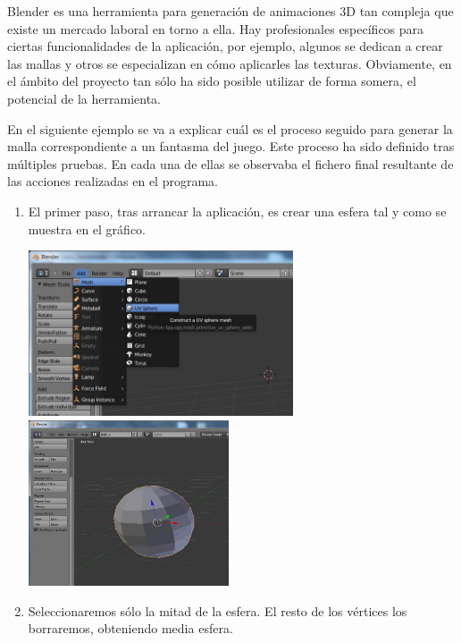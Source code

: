 Blender es una herramienta para generación de animaciones 3D tan compleja que existe un mercado laboral en torno a ella. Hay profesionales específicos para ciertas funcionalidades de la aplicación, por ejemplo, algunos se dedican a crear las mallas  y otros se especializan en cómo aplicarles las texturas. Obviamente, en el ámbito del proyecto tan sólo ha sido posible utilizar de forma somera, el potencial de la herramienta.
\newline

En el siguiente ejemplo se va a explicar cuál es el proceso seguido para generar la malla correspondiente a un fantasma del juego. Este proceso ha sido definido tras múltiples pruebas. En cada una de ellas se observaba el fichero final resultante de las acciones realizadas en el programa.

\begin{enumerate}
\item El primer paso, tras arrancar la aplicación, es crear una esfera tal y como se muestra en el gráfico.

   \begin{minipage}{\linewidth}
         \centering
          \includegraphics[height=4.9cm]{img/blender/blender1.jpg} 
	 \includegraphics[height=4.9cm]{img/blender/blender2.jpg}
   \end{minipage}
 

\item Seleccionaremos sólo la mitad de la esfera. El resto de los vértices los borraremos, obteniendo media esfera.


\end{enumerate}
